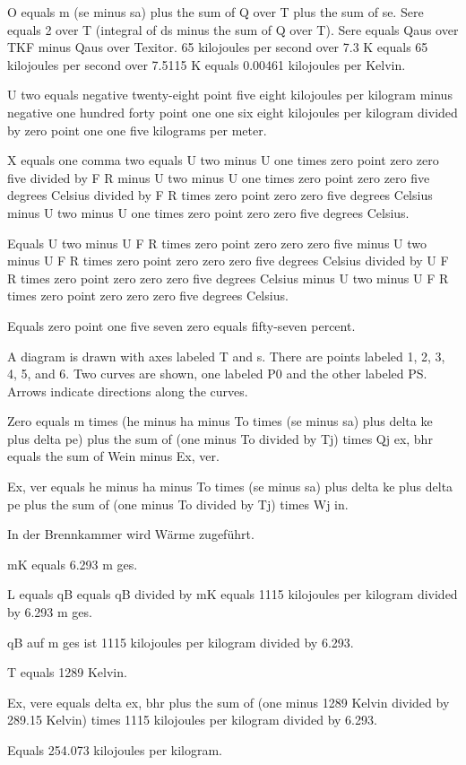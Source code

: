 O equals m (se minus sa) plus the sum of Q over T plus the sum of se.
Sere equals 2 over T (integral of ds minus the sum of Q over T).
Sere equals Qaus over TKF minus Qaus over Texitor.
65 kilojoules per second over 7.3 K equals 65 kilojoules per second over 7.5115 K equals 0.00461 kilojoules per Kelvin.

U two equals negative twenty-eight point five eight kilojoules per kilogram minus negative one hundred forty point one one six eight kilojoules per kilogram divided by zero point one one five kilograms per meter.

X equals one comma two equals U two minus U one times zero point zero zero five divided by F R minus U two minus U one times zero point zero zero five degrees Celsius divided by F R times zero point zero zero five degrees Celsius minus U two minus U one times zero point zero zero five degrees Celsius.

Equals U two minus U F R times zero point zero zero zero five minus U two minus U F R times zero point zero zero zero five degrees Celsius divided by U F R times zero point zero zero zero five degrees Celsius minus U two minus U F R times zero point zero zero zero five degrees Celsius.

Equals zero point one five seven zero equals fifty-seven percent.

A diagram is drawn with axes labeled T and s. There are points labeled 1, 2, 3, 4, 5, and 6. Two curves are shown, one labeled P0 and the other labeled PS. Arrows indicate directions along the curves.

Zero equals m times (he minus ha minus To times (se minus sa) plus delta ke plus delta pe) plus the sum of (one minus To divided by Tj) times Qj ex, bhr equals the sum of Wein minus Ex, ver.

Ex, ver equals he minus ha minus To times (se minus sa) plus delta ke plus delta pe plus the sum of (one minus To divided by Tj) times Wj in.

In der Brennkammer wird Wärme zugeführt.

mK equals 6.293 m ges.

L equals qB equals qB divided by mK equals 1115 kilojoules per kilogram divided by 6.293 m ges.

qB auf m ges ist 1115 kilojoules per kilogram divided by 6.293.

T equals 1289 Kelvin.

Ex, vere equals delta ex, bhr plus the sum of (one minus 1289 Kelvin divided by 289.15 Kelvin) times 1115 kilojoules per kilogram divided by 6.293.

Equals 254.073 kilojoules per kilogram.